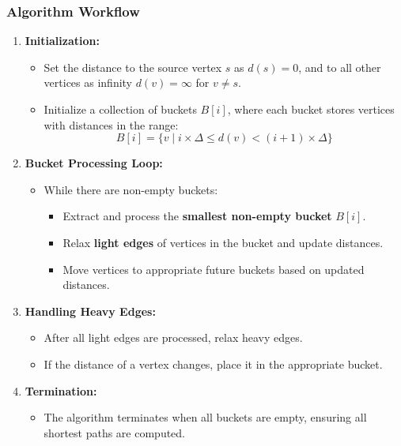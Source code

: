 \documentclass{article}
\begin{document}
\subsubsection*{Algorithm Workflow}
\begin{enumerate}
    \item \textbf{Initialization:}
    \begin{itemize}
        \item Set the distance to the source vertex \( s \) as \( d(s) = 0 \), and to all other vertices as infinity \( d(v) = \infty \) for \( v \neq s \).
        \item Initialize a collection of buckets \( B[i] \), where each bucket stores vertices with distances in the range:
        \[
        B[i] = \{ v \mid i \times \Delta \leq d(v) < (i + 1) \times \Delta \}
        \]
    \end{itemize}
    
    \item \textbf{Bucket Processing Loop:}
    \begin{itemize}
        \item While there are non-empty buckets:
        \begin{itemize}
            \item Extract and process the \textbf{smallest non-empty bucket} \( B[i] \).
            \item Relax \textbf{light edges} of vertices in the bucket and update distances.
            \item Move vertices to appropriate future buckets based on updated distances.
        \end{itemize}
    \end{itemize}
    
    \item \textbf{Handling Heavy Edges:}
    \begin{itemize}
        \item After all light edges are processed, relax heavy edges.
        \item If the distance of a vertex changes, place it in the appropriate bucket.
    \end{itemize}
    
    \item \textbf{Termination:}
    \begin{itemize}
        \item The algorithm terminates when all buckets are empty, ensuring all shortest paths are computed.
    \end{itemize}
\end{enumerate}
\end{document}
